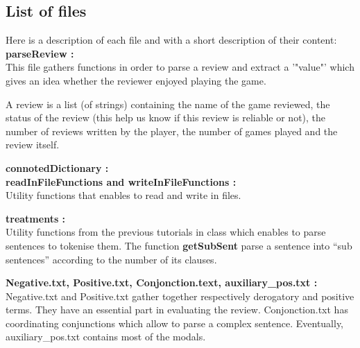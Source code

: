 \documentclass[paper=a4,fontsize=12pt]{report}
\begin{document}
\subsection{List of files}
	Here is a description of each file and with a short description of their content:\\

\textbf{parseReview :} \\
This file gathers functions in order to parse a review and extract a '"value"' which gives an idea whether the reviewer enjoyed playing the game.

A review is a list (of strings) containing  the name of the game reviewed, the status of the review (this help us know if this review is reliable or not), the number of reviews written by the player, the number of games played and the review itself. 

\textbf{connotedDictionary :} \\

\textbf{readInFileFunctions and writeInFileFunctions :} \\
Utility functions that enables to read and write in files. 

\textbf{treatments :} \\  
Utility functions from the previous tutorials in class which enables to parse sentences to tokenise them. The function \textbf{getSubSent} parse a sentence into "`sub sentences"' according to the number of its clauses.

\textbf{Negative.txt, Positive.txt, Conjonction.text, auxiliary\_pos.txt :} \\
Negative.txt and Positive.txt gather together respectively derogatory and positive terms. They have an essential part in evaluating the review. Conjonction.txt has coordinating conjunctions which allow to parse a complex sentence. Eventually, auxiliary\_pos.txt contains most of the modals. 
\end{document}
